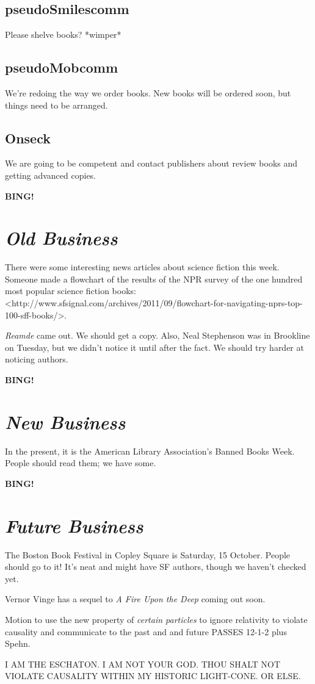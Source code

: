 \documentclass[10pt]{article}
\newcommand{\bing}{{\bf BING!} }
\newcommand{\goto}[1]{\bing \vskip 12pt \section*{{\em{#1}}}}
\newcommand{\ps}{ plus Spehn\xspace}
\begin{document}
\subsection*{pseudoSmilescomm}

Please shelve books?  *wimper*


\subsection*{pseudoMobcomm}

We're redoing the way we order books.  New books will be ordered
soon, but things need to be arranged.


\subsection*{Onseck}

We are going to be competent and contact publishers about review books
and getting advanced copies.


\goto{Old Business}

There were some interesting news articles about science fiction this week.
Someone made a flowchart of the results of the NPR survey of the one hundred
most popular science fiction books: <http://www.sfsignal.com/archives/2011/09/flowchart-for-navigating-nprs-top-100-sff-books/>.

\emph{Reamde} came out.  We should get a copy. Also, Neal Stephenson was
in Brookline on Tuesday, but we didn't notice it until after the fact.
We should try harder at noticing authors. 


\goto{New Business}

In the present, it is the American Library Association's Banned Books Week.
People should read them; we have some.


\goto{Future Business}

The Boston Book Festival in Copley Square is Saturday, 15 October.  People
should go to it!  It's neat and might have SF authors, though we haven't
checked yet.

Vernor Vinge has a sequel to \emph{A Fire Upon the Deep} coming out
soon.  

Motion to use the new property of \emph{certain particles} to ignore
relativity to violate causality and communicate to the past and and
future PASSES 12-1-2\ps.

I AM THE ESCHATON.
I AM NOT YOUR GOD.
THOU SHALT NOT VIOLATE CAUSALITY WITHIN MY HISTORIC LIGHT-CONE.
OR ELSE.
\end{document}
